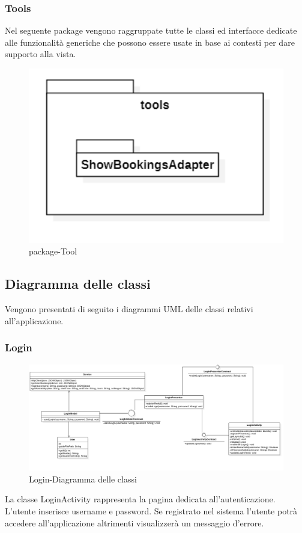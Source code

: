\subsubsection{Tools}
Nel seguente package vengono raggruppate tutte le classi ed interfacce dedicate alle funzionalità generiche che possono essere usate in base ai contesti per dare supporto alla vista.
\begin{figure}[H]
	\centering
	\includegraphics[width=16cm]{res/images/apputenti-packageTools.png}
	\caption{package-Tool}
	\label{fig:package-Tool}
\end{figure}

\subsection{Diagramma delle classi}
Vengono presentati di seguito i diagrammi UML delle classi relativi all'applicazione.

\subsubsection{Login}
\begin{figure}[H]
	\centering
	\includegraphics[width=16cm]{res/images/loginClass.png}
	\caption{Login-Diagramma delle classi}
	\label{fig:Login-Diagramma delle classi}
\end{figure}
La classe LoginActivity rappresenta la pagina dedicata all'autenticazione. L'utente inserisce username e password. Se registrato nel sistema l'utente potrà accedere all'applicazione altrimenti visualizzerà un messaggio d'errore.

